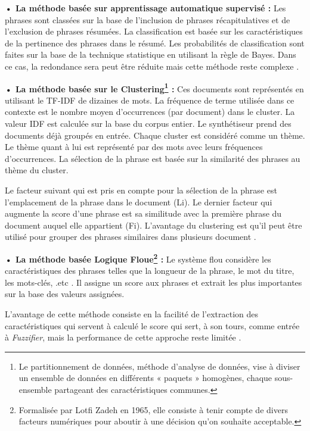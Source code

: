         \textbf{• La méthode basée sur apprentissage automatique supervisé :} Les phrases sont classées sur la base de l'inclusion de phrases récapitulatives et de l'exclusion de phrases résumées. La classification est basée sur les caractéristiques de la pertinence des phrases dans le résumé. Les probabilités de classification sont faites sur la base de la technique statistique en utilisant la règle de Bayes. Dans ce cas, la redondance sera peut être réduite mais cette méthode reste complexe \cite{surveysummarization}.
            
        \textbf{• La méthode basée sur le Clustering\footnote{Le partitionnement de données, méthode d'analyse de données, vise à diviser un ensemble de données en différents « paquets » homogènes, chaque sous-ensemble partageant des caractéristiques communes.} :} Ces documents sont représentés en utilisant le TF-IDF de dizaines de mots. La fréquence de terme utilisée dans ce contexte est le nombre moyen d'occurrences (par document) dans le cluster. La valeur IDF est calculée sur la base du corpus entier. Le synthétiseur prend des documents déjà groupés en entrée. Chaque cluster est considéré comme un thème.
        Le thème quant à lui est représenté par des mots avec leurs fréquences d’occurrences. La sélection de la phrase est basée sur la similarité des phrases au thème du cluster. 

        Le facteur suivant qui est pris en compte pour la sélection de la phrase est l'emplacement de la phrase dans le document (Li). Le dernier facteur qui augmente la score d'une phrase est sa similitude avec la première phrase du document auquel elle appartient (Fi). L'avantage du clustering est qu'il peut être utilisé pour grouper des phrases similaires dans plusieurs document \cite{surveysummarization}.
            
        \textbf{• La méthode basée Logique Floue\footnote{Formalisée par Lotfi Zadeh en 1965, elle consiste à tenir compte de divers facteurs numériques pour aboutir à une décision qu'on souhaite acceptable.} :} Le système flou considère les caractéristiques des phrases telles que la longueur de la phrase, le mot du titre, les mots-clés, .etc \cite{10}. Il assigne un score aux phrases et extrait les plus importantes sur la base des valeurs assignées.

        L'avantage de cette méthode consiste en la facilité de l'extraction des caractéristiques qui servent à calculé le score qui sert, à son tours, comme entrée à \emph{Fuzzifier}, mais la performance de cette approche reste limitée \cite{surveysummarization}.

